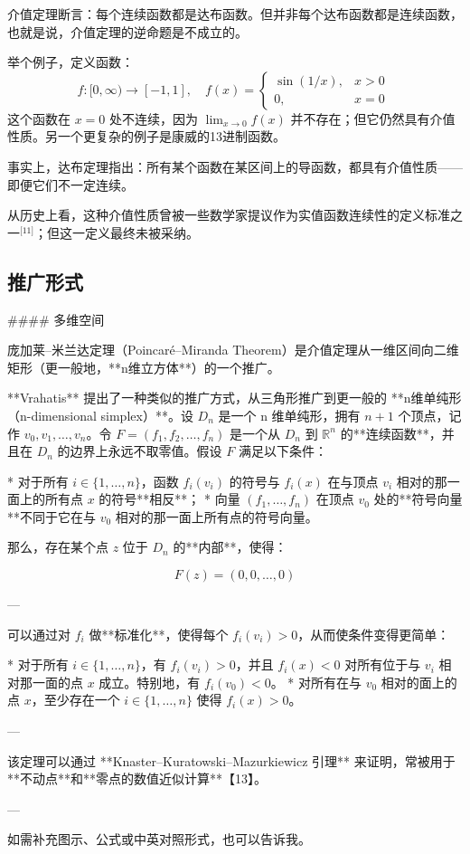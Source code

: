 介值定理断言：每个连续函数都是达布函数。但并非每个达布函数都是连续函数，也就是说，介值定理的逆命题是不成立的。

举个例子，定义函数：
$$
f : [0, \infty) \to [-1, 1], \quad f(x) = \begin{cases}
\sin(1/x), & x > 0 \\
0, & x = 0
\end{cases}~
$$
这个函数在 $x = 0$ 处不连续，因为 $\lim_{x \to 0} f(x)$ 并不存在；但它仍然具有介值性质。另一个更复杂的例子是康威的13进制函数。

事实上，达布定理指出：所有某个函数在某区间上的导函数，都具有介值性质——即便它们不一定连续。

从历史上看，这种介值性质曾被一些数学家提议作为实值函数连续性的定义标准之一\(^\text{[11]}\)；但这一定义最终未被采纳。
\subsection{推广形式}

#### 多维空间

\*\*庞加莱–米兰达定理（Poincaré–Miranda Theorem）\*\*是介值定理从一维区间向二维矩形（更一般地，**n维立方体**）的一个推广。

**Vrahatis** 提出了一种类似的推广方式，从三角形推广到更一般的 **n维单纯形（n-dimensional simplex）**。设 $D_n$ 是一个 n 维单纯形，拥有 $n+1$ 个顶点，记作 $v_0, v_1, \dots, v_n$。令 $F = (f_1, f_2, \dots, f_n)$ 是一个从 $D_n$ 到 $\mathbb{R}^n$ 的**连续函数**，并且在 $D_n$ 的边界上永远不取零值。假设 $F$ 满足以下条件：

* 对于所有 $i \in \{1, \dots, n\}$，函数 $f_i(v_i)$ 的符号与 $f_i(x)$ 在与顶点 $v_i$ 相对的那一面上的所有点 $x$ 的符号**相反**；
* 向量 $(f_1, \dots, f_n)$ 在顶点 $v_0$ 处的**符号向量**不同于它在与 $v_0$ 相对的那一面上所有点的符号向量。

那么，存在某个点 $z$ 位于 $D_n$ 的**内部**，使得：

$$
F(z) = (0, 0, \dots, 0)
$$

---

可以通过对 $f_i$ 做**标准化**，使得每个 $f_i(v_i) > 0$，从而使条件变得更简单：

* 对于所有 $i \in \{1, \dots, n\}$，有 $f_i(v_i) > 0$，并且 $f_i(x) < 0$ 对所有位于与 $v_i$ 相对那一面的点 $x$ 成立。特别地，有 $f_i(v_0) < 0$。
* 对所有在与 $v_0$ 相对的面上的点 $x$，至少存在一个 $i \in \{1, \dots, n\}$ 使得 $f_i(x) > 0$。

---

该定理可以通过 **Knaster–Kuratowski–Mazurkiewicz 引理** 来证明，常被用于**不动点**和**零点的数值近似计算**【13】。

---

如需补充图示、公式或中英对照形式，也可以告诉我。
